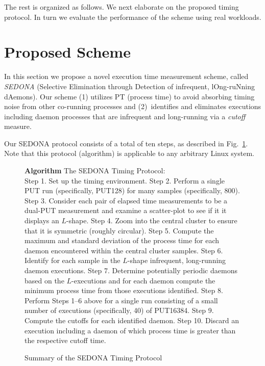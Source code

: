 \documentclass[letter]{ieice}
\begin{document}
\noindent
{\color{blue}
The rest is organized as follows. 
We next elaborate on the proposed timing protocol. In turn we evaluate the performance of the scheme using real workloads. 
}

\section{Proposed Scheme}
\label{sec:prop_appach}

In this section we propose a novel execution time measurement scheme, 
called {\em SEDONA} (Selective Elimination through Detection of infrequent, lOng-ruNning dAemons). 
{\color{blue}
Our scheme (1) utilizes PT (process time) to avoid absorbing timing noise from other co-running processes and (2)~identifies and eliminates executions including daemon processes that are infrequent and \hbox{long-running} via a {\em cutoff} measure. 
}

Our SEDONA protocol consists of a total of ten steps, as described in Fig.~\ref{alg:find}.
{\color{blue} 
Note that this protocol (algorithm) is applicable to any arbitrary Linux system.}

\begin{figure}[h]
\begin{center}
\begin{algorithmic}
{\bf Algorithm} The SEDONA Timing Protocol: \\
\STATE Step 1. Set up the timing environment.
\STATE Step 2. Perform a single PUT run (specifically, PUT128) for many samples (specifically, 800).
\STATE Step 3. Consider each pair of elapsed time measurements to be a dual-PUT measurement 
and examine a scatter-plot to see if it it displays an $L$-shape.
\STATE Step 4. Zoom into the central cluster to ensure that it is symmetric (roughly circular).
\STATE Step 5. Compute the maximum and standard deviation of the process time 
for each daemon encountered within the central cluster samples.
\STATE Step 6. Identify for each sample in the $L$-shape infrequent, long-running daemon executions. 
\STATE Step 7. Determine potentially periodic daemons based on the $L$-executions 
and for each daemon compute the minimum process time from those executions identified. 
\STATE Step 8. Perform Steps 1--6 above for a single run 
consisting of a small number of executions (specifically, 40) of PUT16384.  
\STATE Step 9. Compute the cutoffs for each identified daemon. 
\STATE Step 10. Discard an execution including a daemon of which process time is greater than the respective cutoff time.
\end{algorithmic}
\end{center}
\caption{Summary of the SEDONA Timing Protocol\label{alg:find}}
\vspace{-0.25in}
\end{figure}
\end{document}
